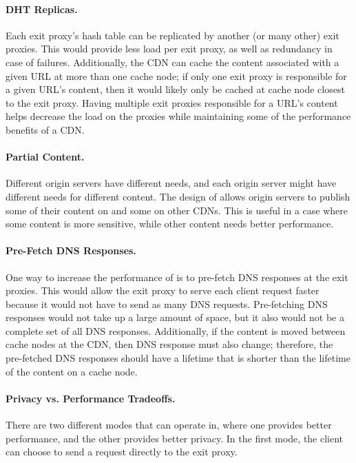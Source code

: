 \paragraph{DHT Replicas.}
Each exit proxy's hash table can be replicated by another (or many other) exit proxies.  This 
would provide less load per exit proxy, as well as redundancy in case of failures.  Additionally, 
the CDN can cache the content associated with a given URL at more than one cache
node;
if only one exit proxy is responsible for a given URL's content, then it would likely only be cached at 
cache node closest to the exit proxy.  Having multiple exit proxies responsible for a URL's content 
helps decrease the load on the proxies while maintaining some of the performance benefits of a CDN.

\paragraph{Partial Content.}
Different origin servers have different needs, and each origin server might 
have different needs for different content.  The design of \system{} allows origin servers
 to publish some of their content on \system{} and some on other CDNs.  
This is useful in a case where some content is more sensitive, while other content needs 
better performance.

\paragraph{Pre-Fetch DNS Responses.} 
One way to increase the performance of \system{} is to pre-fetch DNS responses at 
the exit proxies.  This would allow the exit proxy to serve each client request faster 
because it would not have to send as many DNS requests.  Pre-fetching DNS responses would 
not take up a large amount of space, but it also would not be a complete set of all DNS 
responses.  Additionally, if the content is moved between cache nodes at the CDN, then DNS 
response must also change; therefore, the pre-fetched DNS responses should have a lifetime 
that is shorter than the lifetime of the content on a cache node.

\paragraph{Privacy vs. Performance Tradeoffs.}
There are two different modes that \system{} can operate in, where one provides better 
performance, and the other provides better privacy.  In the first mode, the client can 
choose to send a request directly to the exit proxy.  

